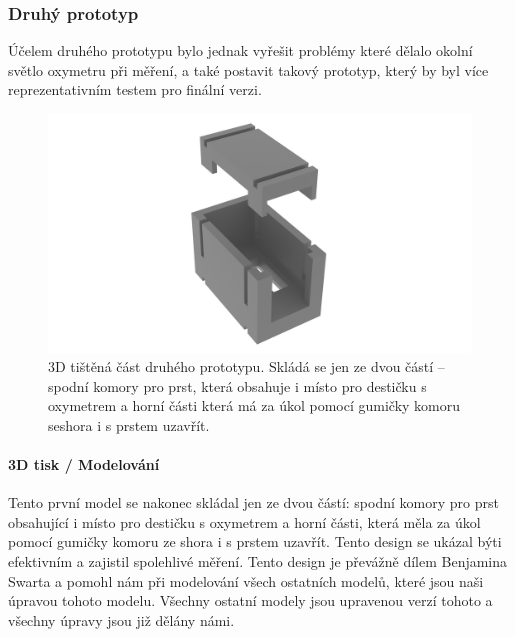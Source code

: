 \subsubsection {Druhý prototyp}
Účelem druhého prototypu bylo jednak vyřešit problémy které dělalo okolní světlo oxymetru při měření, a také postavit takový prototyp, který by byl více reprezentativním testem pro finální verzi.
\begin{figure}[ht]
  \includegraphics[scale=0.13, center]{Kapitoly/Prakticka/Obrazky/Druhý_prototyp2_w.png}
  \caption [3D model druhého prototypu]{3D tištěná část druhého prototypu. Skládá se jen ze dvou částí – spodní komory pro prst, která obsahuje i místo pro destičku s oxymetrem a horní části která má za úkol pomocí gumičky komoru seshora i s prstem uzavřít.}
  \label{fig:3D_model_druhého_prototypu}
\end{figure}
\paragraph{3D tisk / Modelování}
Tento první model se nakonec skládal jen ze dvou částí: spodní komory pro prst obsahující i místo pro destičku s oxymetrem a horní části, která měla za úkol pomocí gumičky komoru ze shora i s prstem uzavřít. Tento design se ukázal býti efektivním a zajistil spolehlivé měření. Tento design je převážně dílem Benjamina Swarta a pomohl nám při modelování všech ostatních modelů, které jsou naši úpravou tohoto modelu. Všechny ostatní modely jsou upravenou verzí tohoto a všechny úpravy jsou již dělány námi.
